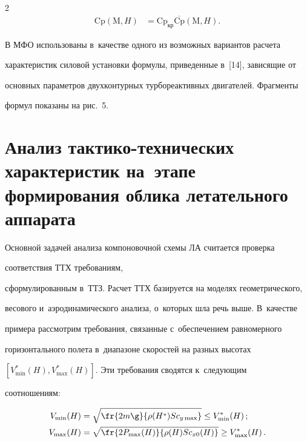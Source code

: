 \begin{multicols}{2}
\begin{align*}
\mathrm{Cp}(\mathrm{M}, H)&=\mathrm{Cp}_{\mathrm{кр}}\overline{\mathrm{Cp}}(\mathrm{M},H).


  \end{align*}


  


  В МФО использованы в~качестве одного из возможных вариантов расчета 


характеристик силовой установки формулы, приведенные в~[14], зависящие от 


основных параметров двухконтурных турбореактивных двигателей. Фрагменты 


формул показаны на рис.~5.


  


  


  


\section{Анализ тактико-технических характеристик на~этапе формирования облика летательного аппарата}





   Основной задачей анализа компоновочной схемы ЛА считается проверка 


соответствия ТТХ требованиям, 


сформулированным в~ТТЗ. Расчет ТТХ базируется на моделях геометрического, 


весового и~аэродинамического анализа, о~которых шла речь выше. В~качестве 


примера рассмотрим требования, связанные с~обеспечением равномерного 


горизонтального полета в~диапазоне скоростей на разных высотах 


   $[V^*_{\min}(H), V^*_{\max}(H)]$. Эти требования сводятся к~сле\-ду\-ющим 


соотношениям:


   \begin{align*}


   V_{\min}(H)&= \sqrt{\fr{2m\g}{\rho(H^*) Sc_{y\max}}}\leq V^*_{\min}(H)\,;\\


   V_{\max}(H)&= \sqrt{\fr{2P_{\max}(H)}{\rho(H) Sc_{x0}(H)}}\geq 


V^*_{\max}(H)\,.


   \end{align*}



\end{multicols}
